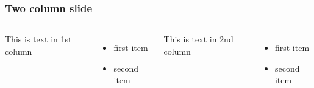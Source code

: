 \documentclass{beamer}
\begin{document}
\begin{frame}
\frametitle{Two column slide}
\begin{columns}
This is text in 1st column
\begin{itemize}
    \item first item
    \item second item
\end{itemize}

This is text in 2nd column
\begin{itemize}
    \item first item
    \item second item
\end{itemize}
    
\end{columns} 
\end{frame}
\end{document}
